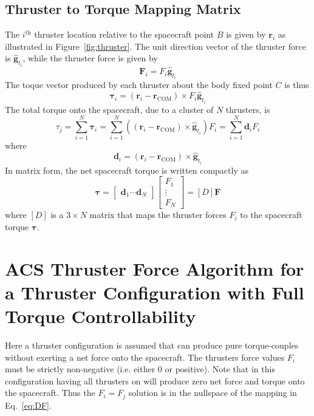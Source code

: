 \documentclass[]{BasiliskReportMemo}
\begin{document}
\subsection{Thruster to Torque Mapping Matrix}
The $i^{\text{th}}$ thruster location relative to the spacecraft point $B$ is given by $\bm r_{i}$ as illustrated in Figure~\ref{fig:thruster}.  The unit direction vector of the thruster force is $\hat{\bm g}_{t_{i}}$, while the thruster force is given by
\begin{equation}
	\label{eq:th:1}
	\bm F_{i} = F_{i} \hat{\bm g}_{t_{i}}
\end{equation}
The toque vector produced by each thruster about the body fixed point $C$ is thus
\begin{equation}
	\bm \tau_{i} = (\bm r_{i} - \bm r_{\text{COM}}) \times F_{i}  \hat{\bm g}_{t_{i}}
\end{equation}
The total torque onto the spacecraft, due to a cluster of $N$ thrusters, is
\begin{equation}
	\tau_{j} = \sum_{i=1}^{N} \bm \tau_{i} 
	= \sum_{i=1}^{N}  ((\bm r_{i} - \bm r_{\text{COM}}) \times \hat{\bm g}_{t_{i}}) F_{i} = \sum_{i=1}^{N}  \bm d_{i} F_{i}
\end{equation}
where 
\begin{equation}
	\label{eq:th1:1}
	\bm d_{i} =    ( \bm r_{i} - \bm r_{\text{COM}})  \times \hat{\bm g}_{t_{i}}
\end{equation}
In matrix form, the net spacecraft torque is written compactly as
\begin{equation}
	\label{eq:DF}
	 \bm\tau = \begin{bmatrix}
		 \bm d_{1} \cdots  \bm d_{N}
	\end{bmatrix} \begin{bmatrix}
		F_{1} \\
		\vdots \\
		F_{N}
	\end{bmatrix} = [D] \bm F
\end{equation}
where $[D]$ is a $3\times N$ matrix that maps the thruster forces $F_{i}$ to the spacecraft torque $\bm \tau$. 


\section{ACS Thruster Force Algorithm for a Thruster Configuration with Full Torque Controllability}
Here a thruster configuration is assumed that can produce pure torque-couples without exerting a net force onto the spacecraft.  The thrusters force values $F_{i}$ must be strictly non-negative (i.e. either 0 or positive).   Note that in this configuration having all thrusters on will produce zero net force and torque onto the spacecraft.  Thus the $F_{i} = F_{j}$ solution is in the nullspace of the mapping in Eq.~\eqref{eq:DF}.  
\end{document}
